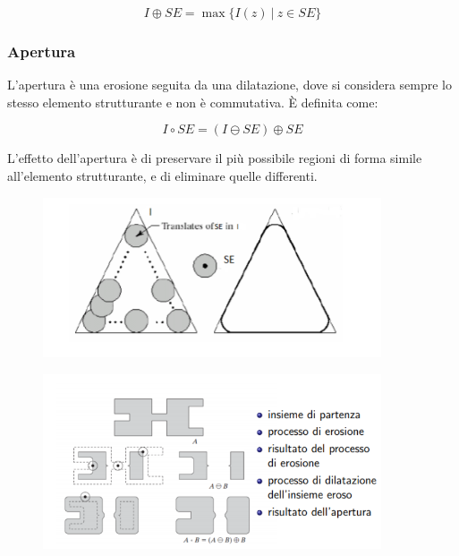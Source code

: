 $$
    I \oplus SE = \max\{I(z) \ | \ z \in SE\}
$$




\subsubsection{Apertura}
L'apertura è una erosione seguita da una dilatazione, dove si considera sempre lo stesso elemento strutturante e non è commutativa.
È definita come:

$$
    I \circ SE = (I \ominus SE) \oplus SE
$$

L'effetto dell'apertura è di preservare il più possibile regioni di forma simile all'elemento strutturante, e di eliminare quelle
differenti.

\begin{figure}[H]
    \centering
    \includegraphics[width=10cm, keepaspectratio]{capitoli/immagini/imgs/apertura.png}
\end{figure}

\begin{figure}[H]
    \centering
    \includegraphics[width=10cm, keepaspectratio]{capitoli/immagini/imgs/apertura_bella.png}
\end{figure}

